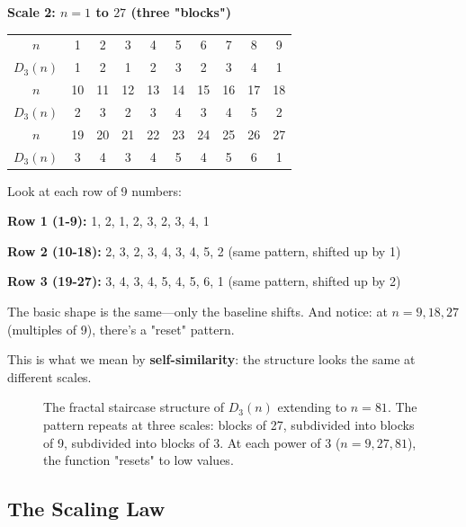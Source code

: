\begin{center}
\textbf{Scale 2: $n = 1$ to $27$ (three "blocks")}
\begin{tabular}{c|ccc|ccc|ccc}
$n$ & 1 & 2 & 3 & 4 & 5 & 6 & 7 & 8 & 9 \\
$D_3(n)$ & 1 & 2 & 1 & 2 & 3 & 2 & 3 & 4 & 1 \\
\hline
$n$ & 10 & 11 & 12 & 13 & 14 & 15 & 16 & 17 & 18 \\
$D_3(n)$ & 2 & 3 & 2 & 3 & 4 & 3 & 4 & 5 & 2 \\
\hline
$n$ & 19 & 20 & 21 & 22 & 23 & 24 & 25 & 26 & 27 \\
$D_3(n)$ & 3 & 4 & 3 & 4 & 5 & 4 & 5 & 6 & 1 \\
\end{tabular}
\end{center}

\begin{intuitive}
Look at each row of 9 numbers:

\textbf{Row 1 (1-9):} 1, 2, 1, 2, 3, 2, 3, 4, 1

\textbf{Row 2 (10-18):} 2, 3, 2, 3, 4, 3, 4, 5, 2 (same pattern, shifted up by 1)

\textbf{Row 3 (19-27):} 3, 4, 3, 4, 5, 4, 5, 6, 1 (same pattern, shifted up by 2)

The basic shape is the same—only the baseline shifts. And notice: at $n = 9, 18, 27$ (multiples of 9), there's a "reset" pattern.

This is what we mean by \textbf{self-similarity}: the structure looks the same at different scales.
\end{intuitive}

\begin{figure}[h]
\centering

\caption{The fractal staircase structure of $D_3(n)$ extending to $n = 81$. The pattern repeats at three scales: blocks of 27, subdivided into blocks of 9, subdivided into blocks of 3. At each power of 3 ($n = 9, 27, 81$), the function "resets" to low values.}
\label{fig:fractalstaircase}
\end{figure}

\subsection{The Scaling Law}
\label{subsec:scaling-law}



